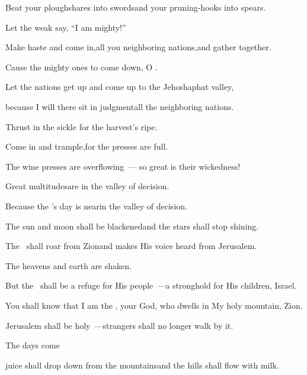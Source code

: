 \begin{inparaenum}
  \pb{} Beat your ploughshares into swords\pa{}and your pruning-hooks into spears.%

  \pb{}Let the weak say, ``I am mighty!''%

  \pb{} Make haste and come in,\pa{}all you neighboring nations,\pa{}and gather together.%

  \pb{}Cause the mighty ones to come down, O \lord.%

  \pb{} Let the nations get up and come up to the Jehoshaphat valley,%

  \pb{}because I will there sit in judgment\pa{}all the neighboring nations.%

  \pc{} Thrust in the sickle%
  for the harvest's ripe.%

  \pc{}Come in and trample,\pa{}for the presses are full.%

  \pc{}The wine presses are overflowing~---\pa{} so great is their wickedness!%

  \pc{} Great multitudes\pa{}are in the valley of decision.%

  \pc{}Because the \lord's day is near\pa{}in the valley of decision.%

  \pc{} The sun and moon shall be blackened\pa{}and the stars shall stop shining.%

  \pc{} The \lord\ shall roar from Zion\pa{}and makes His voice heard from Jerusalem.%

  \pc{}The heavens and earth are shaken.%

  \pc{}But the \lord\ shall be a refuge for His people~---\pa{}a stronghold for His children, Israel.%

  \pb{} You shall know that I am the \lord, your God,%
  \pa{}who dwells in My holy mountain, Zion.%

  \pb{}Jerusalem shall be holy~---\pa{}strangers shall no longer walk by it.%

  \pa{} The days come%

  \pa{}juice shall drop down from the mountains\pa{}and the hills shall flow with milk.%


\end{inparaenum}
